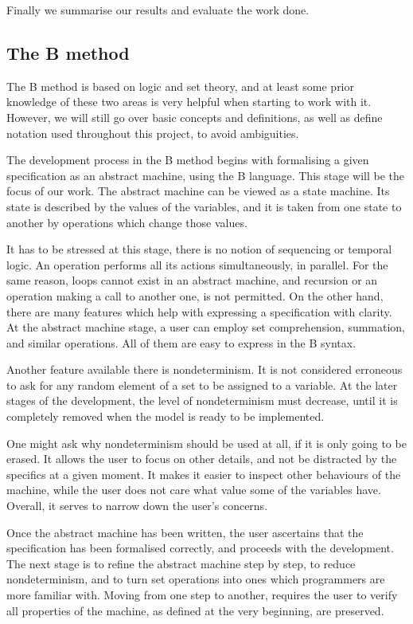 \documentclass[12pt,journal,duplex]{IEEEtran}
\begin{document}
	Finally we summarise our results and evaluate the work done.

	\subsection{The B method}
	The B method is based on logic and set theory, and at least some prior knowledge of these two areas is very helpful when starting to work with it. However, we will still go over basic concepts and definitions, as well as define notation used throughout this project, to avoid ambiguities.

	The development process in the B method begins with formalising a given specification as an abstract machine, using the B language. This stage will be the focus of our work. The abstract machine can be viewed as a state machine. Its state is described by the values of the variables, and it is taken from one state to another by operations which change those values.

	It has to be stressed at this stage, there is no notion of sequencing or temporal logic. An operation performs all its actions simultaneously, in parallel. For the same reason, loops cannot exist in an abstract machine, and recursion or an operation making a call to another one, is not permitted. On the other hand, there are many features which help with expressing a specification with clarity. At the abstract machine stage, a user can employ set comprehension, summation, and similar operations. All of them are easy to express in the B syntax.

	Another feature available there is nondeterminism. It is not considered erroneous to ask for any random element of a set to be assigned to a variable. At the later stages of the development, the level of nondeterminism must decrease, until it is completely removed when the model is ready to be implemented.

	One might ask why nondeterminism should be used at all, if it is only going to be erased. It allows the user to focus on other details, and not be distracted by the specifics at a given moment. It makes it easier to inspect other behaviours of the machine, while the user does not care what value some of the variables have. Overall, it serves to narrow down the user's concerns.

	Once the abstract machine has been written, the user ascertains that the specification has been formalised correctly, and proceeds with the development. The next stage is to refine the abstract machine step by step, to reduce nondeterminism, and to turn set operations into ones which programmers are more familiar with. Moving from one step to another, requires the user to verify all properties of the machine, as defined at the very beginning, are preserved.
\end{document}
